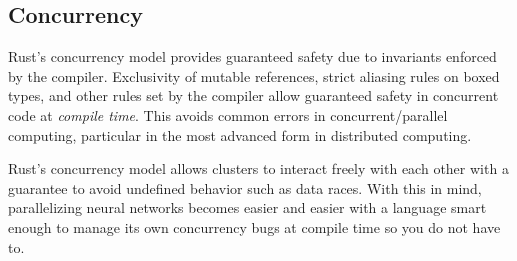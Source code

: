 \begin{multicols}{2}
\subsection{Concurrency}
Rust's concurrency model provides guaranteed safety due to invariants enforced by the compiler. Exclusivity of mutable
references, strict aliasing rules on boxed types, and other rules set by the compiler allow guaranteed safety in
concurrent code at \textit{compile time}. This avoids common errors in concurrent/parallel computing, particular in
the most advanced form in distributed computing.

Rust's concurrency model allows clusters to interact freely with each other with a guarantee to avoid undefined
behavior such as data races. With this in mind, parallelizing neural networks becomes easier and easier with a language
smart enough to manage its own concurrency bugs at compile time so you do not have to.

\end{multicols}

